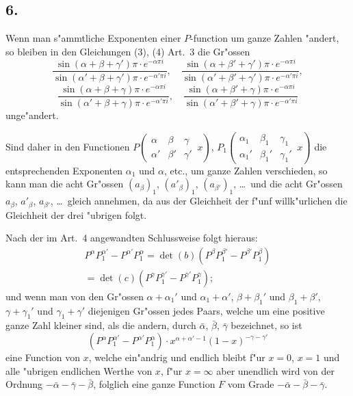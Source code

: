 \documentclass[12pt,a4paper]{book}
\theoremstyle{definition}
\theoremstyle{remark}
\begin{document}
\subsection*{6.}

Wenn man s{"a}mmtliche Exponenten einer $P$-function um ganze Zahlen {"a}ndert, so bleiben in den Gleichungen (3), (4) Art.~3 die Gr{"o}ssen
\[
\frac{\sin(\alpha + \beta + \gamma')\pi \cdot e^{-\alpha\pi i}}{\sin(\alpha' + \beta + \gamma')\pi \cdot e^{-\alpha'\pi i}}, \quad
\frac{\sin(\alpha + \beta' + \gamma')\pi \cdot e^{-\alpha\pi i}}{\sin(\alpha' + \beta' + \gamma')\pi \cdot e^{-\alpha'\pi i}},
\]
\[
\frac{\sin(\alpha + \beta + \gamma)\pi \cdot e^{-\alpha\pi i}}{\sin(\alpha' + \beta + \gamma)\pi \cdot e^{-\alpha'\pi i}}, \quad
\frac{\sin(\alpha + \beta' + \gamma)\pi \cdot e^{-\alpha\pi i}}{\sin(\alpha' + \beta' + \gamma)\pi \cdot e^{-\alpha'\pi i}}
\]
unge{"a}ndert.

Sind daher in den Functionen $P\left(\begin{array}{ccc|} \alpha & \beta & \gamma \\ \alpha' & \beta' & \gamma' \end{array}\, x\right)$, $P_1\left(\begin{array}{ccc|} \alpha_1 & \beta_1 & \gamma_1 \\ \alpha_1' & \beta_1' & \gamma_1' \end{array}\, x\right)$ die entsprechenden Exponenten $\alpha_1$ und $\alpha$, etc., um ganze Zahlen verschieden, so kann man die acht Gr{"o}ssen $(a_{\beta})_1$, $(a'_{\beta})_1$, $(a_{\beta'})_1$, \dots\ und die acht Gr{"o}ssen $a_{\beta}$, $a'_{\beta}$, $a_{\beta'}$, \dots\ gleich annehmen, da aus der Gleichheit der f{"u}nf willk{"u}rlichen die Gleichheit der drei {"u}brigen folgt.

Nach der im Art.~4 angewandten Schlussweise folgt hieraus:
\begin{multline*}
P^{\alpha} P_1^{\alpha'} - P^{\alpha'} P_1^{\alpha} = \det(b)(P^{\beta} P_1^{\beta'} - P^{\beta'} P_1^{\beta}) \\
= \det(c)(P^{\gamma} P_1^{\gamma'} - P^{\gamma'} P_1^{\gamma});
\end{multline*}
und wenn man von den Gr{"o}ssen $\alpha + \alpha_1'$ und $\alpha_1 + \alpha'$, $\beta + \beta_1'$ und $\beta_1 + \beta'$, $\gamma + \gamma_1'$ und $\gamma_1 + \gamma'$ diejenigen Gr{"o}ssen jedes Paars, welche um eine positive ganze Zahl kleiner sind, als die andern, durch $\bar{\alpha}$, $\bar{\beta}$, $\bar{\gamma}$ bezeichnet, so ist
\[
(P^{\alpha} P_1^{\alpha'} - P^{\alpha'} P_1^{\alpha}) \cdot x^{\alpha+\alpha'-1} (1-x)^{-\gamma-\gamma'}
\]
eine Function von $x$, welche ein{"a}ndrig und endlich bleibt f{"u}r $x = 0$, $x = 1$ und alle {"u}brigen endlichen Werthe von $x$, f{"u}r $x = \infty$ aber unendlich wird von der Ordnung $-\bar{\alpha} - \bar{\gamma} - \bar{\beta}$, folglich eine ganze Function $F$ vom Grade $-\bar{\alpha} - \bar{\beta} - \bar{\gamma}$.
\end{document}
